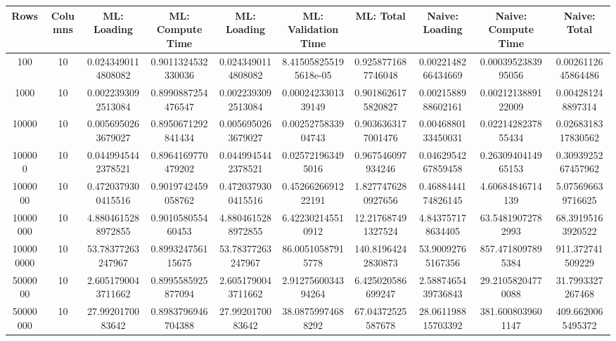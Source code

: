 \begin{table}[htb]
    \centering
    \begin{tabular}{@{}cccccccccc@{}}
        \toprule
        Rows & Columns & ML: Loading & ML: Compute Time & ML: Loading & ML: Validation Time & ML: Total & Naive: Loading & Naive: Compute Time & Naive: Total \\
        \midrule
        100 & 10 & 0.0243490114808082 & 0.9011324532330036 & 0.0243490114808082 & 8.415058255195618e-05 & 0.9258771687746048 & 0.0022148266434669 & 0.0003952383995056 & 0.0026112645864486 \\
        1000 & 10 & 0.0022393092513084 & 0.8990887254476547 & 0.0022393092513084 & 0.0002423301339149 & 0.9018626175820827 & 0.0021588988602161 & 0.0021213889122009 & 0.004281248897314 \\
        10000 & 10 & 0.0056950263679027 & 0.8950671292841434 & 0.0056950263679027 & 0.0025275833904743 & 0.9036363177001476 & 0.0046880133450031 & 0.0221428237855434 & 0.0268318317830562 \\
        100000 & 10 & 0.0449945442378521 & 0.8964169770479202 & 0.0449945442378521 & 0.025721963495016 & 0.967546097934246 & 0.0462954267859458 & 0.2630940414965153 & 0.3093925267457962 \\
        1000000 & 10 & 0.4720379300415516 & 0.9019742459058762 & 0.4720379300415516 & 0.4526626691222191 & 1.8277476280927656 & 0.4688444174826145 & 4.60684846714139 & 5.075696639716625 \\
        10000000 & 10 & 4.8804615288972855 & 0.901058055460453 & 4.8804615288972855 & 6.422302145510912 & 12.217687491327524 & 4.843757178634405 & 63.54819072782993 & 68.39195163920522 \\
        100000000 & 10 & 53.78377263247967 & 0.899324756115675 & 53.78377263247967 & 86.00510587915778 & 140.81964242830873 & 53.90092765167356 & 857.4718097895384 & 911.372741509229 \\
        5000000 & 10 & 2.6051790043711662 & 0.8995585925877094 & 2.6051790043711662 & 2.9127560034394264 & 6.425020586699247 & 2.5887465439736843 & 29.21058204770088 & 31.7993327267468 \\
        50000000 & 10 & 27.9920170083642 & 0.8983796946704388 & 27.9920170083642 & 38.08759974688292 & 67.04372525587678 & 28.061198815703392 & 381.6008039601147 & 409.6620065495372 \\
        \bottomrule
    \end{tabular}
\end{table}